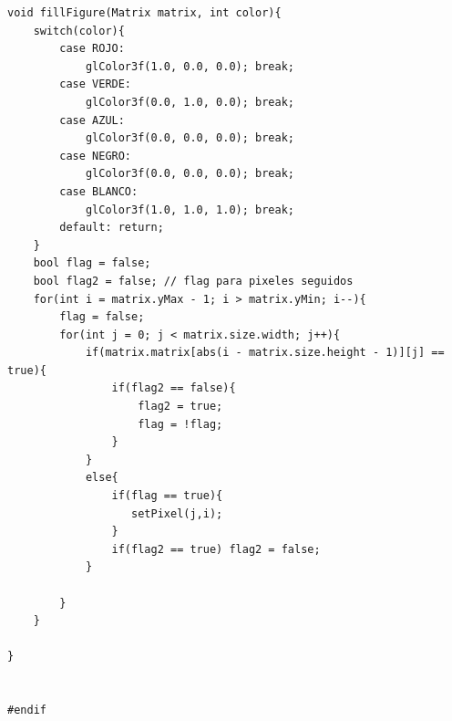 \documentclass[a4paper,12pt]{article}
\begin{document}
\begin{itemize}
\begin{lstlisting}
void fillFigure(Matrix matrix, int color){
    switch(color){
        case ROJO:
            glColor3f(1.0, 0.0, 0.0); break;
        case VERDE:
            glColor3f(0.0, 1.0, 0.0); break;
        case AZUL:
            glColor3f(0.0, 0.0, 0.0); break;
        case NEGRO:
            glColor3f(0.0, 0.0, 0.0); break;
        case BLANCO:
            glColor3f(1.0, 1.0, 1.0); break;
        default: return;
    }
    bool flag = false;
    bool flag2 = false; // flag para pixeles seguidos
    for(int i = matrix.yMax - 1; i > matrix.yMin; i--){
        flag = false;
        for(int j = 0; j < matrix.size.width; j++){
            if(matrix.matrix[abs(i - matrix.size.height - 1)][j] == true){
                if(flag2 == false){
                    flag2 = true;
                    flag = !flag;
                }
            }
            else{
                if(flag == true){
                   setPixel(j,i);
                }
                if(flag2 == true) flag2 = false;
            }
            
        }
    }
    
}


#endif

\end{lstlisting}
\end{itemize}
\end{document}
